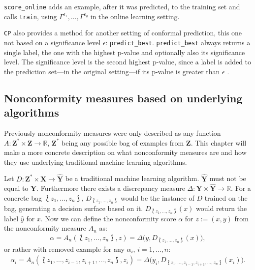 \documentclass[twoside,11pt]{article}
\begin{document}
\texttt{score\_online} adds an example, after it was
predicted, to the training set and calls \texttt{train},
using $\Gamma^{\epsilon_1},\dots,\Gamma^{\epsilon_g}$ in
the online learning setting.

\texttt{CP} also provides a method for another setting of
conformal prediction, this one not based on a significance
level $\epsilon$: \texttt{predict\_best}.
\texttt{predict\_best} always returns a single label, the
one with the highest p-value and optionally also its
significance level. The significance level is the second
highest p-value, since a label is added to the prediction
set---in the original setting---if its p-value is greater
than $\epsilon$ \citep[see][]{papadopoulos_et_al_2007}.

\subsection{Nonconformity measures based on underlying
            algorithms}
\label{subsec:ncs}

Previously nonconformity measures were only described as
any function
$A: \textbf{Z}^* \times \textbf{Z} \rightarrow \mathbb{R}$,
$\textbf{Z}^*$ being any possible bag of examples from
$\textbf{Z}$. This chapter will make a more concrete
description on what nonconformity measures are and how they
use underlying traditional machine learning algorithms.

Let $D:\textbf{Z}^* \times \textbf{X} \rightarrow
\hat{\textbf{Y}}$ be a traditional machine learning
algorithm. $\hat{\textbf{Y}}$ must not be equal to
$\textbf{Y}$. Furthermore there exists a discrepancy
measure $\Delta: \textbf{Y} \times \hat{\textbf{Y}}
\rightarrow \mathbb{R}$.
For a concrete bag $\Lbag z_1,\dots,z_n \Rbag$,
$D_{\Lbag z_1,\dots,z_n \Rbag}$ would be the instance of
$D$ trained on the bag, generating a decision surface based
on it. $D_{\Lbag z_1,\dots,z_n \Rbag}(x)$ would return the
label $\hat{y}$ for $x$. Now we can define the
nonconformity score $\alpha$ for $z := (x, y)$ from the
nonconformity measure $A_n$ as:
\begin{align*}
  \alpha=A_n(\Lbag z_1,\dots,z_n \Rbag, z)=
  \Delta\big(y,D_{\Lbag z_1,\dots,z_n \Rbag}(x)\big),
\end{align*}
or rather with removed example for any $\alpha_i$,
$i = 1,\dots,n$:
\begin{align*}
  \alpha_i = A_n(\Lbag z_1,\dots,z_{i-1},z_{i+1},\dots,z_n
  \Rbag, z_i) = \Delta\big(y_i,D_{\Lbag z_1,\dots,z_{i-1},
  z_{i+1},\dots,z_n \Rbag}(x_i)\big).
\end{align*}
\end{document}
